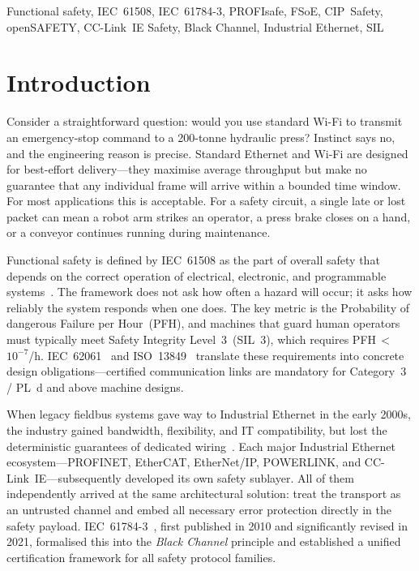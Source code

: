 \documentclass[conference]{IEEEtran}
\begin{document}
\begin{IEEEkeywords}
Functional safety, IEC~61508, IEC~61784-3, PROFIsafe, FSoE, CIP~Safety,
openSAFETY, CC-Link~IE Safety, Black Channel, Industrial Ethernet, SIL
\end{IEEEkeywords}

\section{Introduction}

Consider a straightforward question: would you use standard Wi-Fi to
transmit an emergency-stop command to a 200-tonne hydraulic press?
Instinct says no, and the engineering reason is precise. Standard Ethernet
and Wi-Fi are designed for best-effort delivery---they maximise average
throughput but make no guarantee that any individual frame will arrive
within a bounded time window. For most applications this is acceptable.
For a safety circuit, a single late or lost packet can mean a robot arm
strikes an operator, a press brake closes on a hand, or a conveyor
continues running during maintenance.

Functional safety is defined by IEC~61508 as the part of overall safety
that depends on the correct operation of electrical, electronic, and
programmable systems~\cite{IEC61508}. The framework does not ask how
often a hazard will occur; it asks how reliably the system responds
when one does. The key metric is the Probability of dangerous Failure
per Hour~(PFH), and machines that guard human operators must typically
meet Safety Integrity Level~3~(SIL~3), which requires PFH\,$<$\,$10^{-7}$/h.
IEC~62061~\cite{IEC62061} and ISO~13849~\cite{ISO13849} translate these
requirements into concrete design obligations---certified communication
links are mandatory for Category~3 / PL~d and above machine designs.

When legacy fieldbus systems gave way to Industrial Ethernet in the
early 2000s, the industry gained bandwidth, flexibility, and IT
compatibility, but lost the deterministic guarantees of dedicated
wiring~\cite{Neumann2007,MoyneTilbury2007}. Each major Industrial
Ethernet ecosystem---PROFINET, EtherCAT, EtherNet/IP, POWERLINK, and
CC-Link~IE---subsequently developed its own safety sublayer. All of them
independently arrived at the same architectural solution: treat the
transport as an untrusted channel and embed all necessary error
protection directly in the safety payload. IEC~61784-3~\cite{IEC617843},
first published in 2010 and significantly revised in 2021, formalised
this into the \emph{Black Channel} principle and established a unified
certification framework for all safety protocol families.
\end{document}
